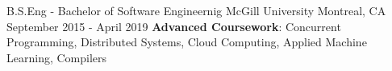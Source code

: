 


\begin{cventries}


\cventry
{B.S.Eng - Bachelor of Software Engineernig} %
{McGill University} %
{Montreal, CA} %
{September 2015 - April 2019} %
{ %
    \textbf{Advanced Coursework}: Concurrent Programming, Distributed Systems, Cloud Computing, Applied Machine Learning, Compilers
}


\end{cventries}
